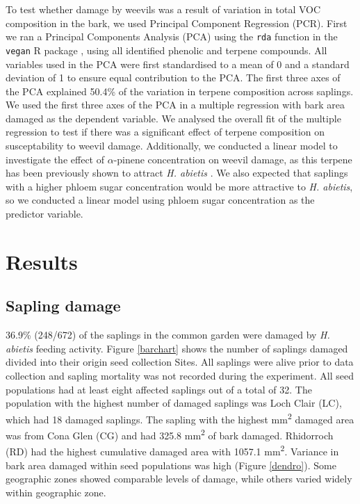 \documentclass[a4paper, 11pt]{article}
\begin{document}
To test whether damage by weevils was a result of variation in total VOC composition in the bark, we used Principal Component Regression (PCR). First we ran a Principal Components Analysis (PCA) using the \texttt{rda} function in the \texttt{vegan} R package \citep{vegan}, using all identified phenolic and terpene compounds. All variables used in the PCA were first standardised to a mean of 0 and a standard deviation of 1 to ensure equal contribution to the PCA. The first three axes of the PCA explained 50.4\% of the variation in terpene composition across saplings. We used the first three axes of the PCA in a multiple regression with bark area damaged as the dependent variable. We analysed the overall fit of the multiple regression to test if there was a significant effect of terpene composition on susceptability to weevil damage. Additionally, we conducted a linear model to investigate the effect of $\alpha$-pinene concentration on weevil damage, as this terpene has been previously shown to attract \textit{H. abietis} \citep{Nordlander1987}. We also expected that saplings with a higher phloem sugar concentration would be more attractive to \textit{H. abietis}, so we conducted a linear model using phloem sugar concentration as the predictor variable.

\section*{Results}

\subsection*{Sapling damage}

36.9\% (248/672) of the saplings in the common garden were damaged by \textit{H. abietis} feeding activity. Figure \ref{barchart} shows the number of saplings damaged divided into their origin seed collection Sites. All saplings were alive prior to data collection and sapling mortality was not recorded during the experiment. All seed populations had at least eight affected saplings out of a total of 32. The population with the highest number of damaged saplings was Loch Clair (LC), which had 18 damaged saplings. The sapling with the highest mm\textsuperscript{2} damaged area was from Cona Glen (CG) and had 325.8 mm\textsuperscript{2} of bark damaged. Rhidorroch (RD) had the highest cumulative damaged area with 1057.1 mm\textsuperscript{2}. Variance in bark area damaged within seed populations was high (Figure \ref{dendro}). Some geographic zones showed comparable levels of damage, while others varied widely within geographic zone.
\end{document}
